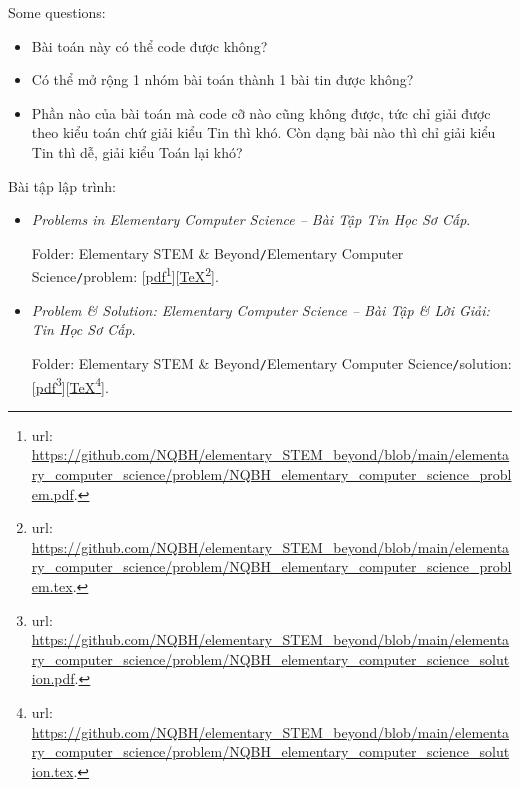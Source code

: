 \documentclass[12pt]{article}
\begin{document}
Some questions:
\begin{itemize}
	\item Bài toán này có thể code được không?
	\item Có thể mở rộng 1 nhóm bài toán thành 1 bài tin được không?
	\item Phần nào của bài toán mà code cỡ nào cũng không được, tức chỉ giải được theo kiểu toán chứ giải kiểu Tin thì khó. Còn dạng bài nào thì chỉ giải kiểu Tin thì dễ, giải kiểu Toán lại khó?
\end{itemize}
Bài tập lập trình:
\begin{itemize}
	\item {\it Problems in Elementary Computer Science -- Bài Tập Tin Học Sơ Cấp}.
	
	Folder: {\sf Elementary STEM \& Beyond{\tt/}Elementary Computer Science{\tt/}problem}: [\href{https://github.com/NQBH/elementary_STEM_beyond/blob/main/elementary_computer_science/problem/NQBH_elementary_computer_science_problem.pdf}{pdf}\footnote{{\sc url}: \url{https://github.com/NQBH/elementary_STEM_beyond/blob/main/elementary_computer_science/problem/NQBH_elementary_computer_science_problem.pdf}.}][\href{https://github.com/NQBH/elementary_STEM_beyond/blob/main/elementary_computer_science/problem/NQBH_elementary_computer_science_problem.tex}{\TeX}\footnote{{\sc url}: \url{https://github.com/NQBH/elementary_STEM_beyond/blob/main/elementary_computer_science/problem/NQBH_elementary_computer_science_problem.tex}.}].
	\item {\it Problem \& Solution: Elementary Computer Science -- Bài Tập \& Lời Giải: Tin Học Sơ Cấp}.
	
	Folder: {\sf Elementary STEM \& Beyond{\tt/}Elementary Computer Science{\tt/}solution}: [\href{https://github.com/NQBH/elementary_STEM_beyond/blob/main/elementary_computer_science/problem/NQBH_elementary_computer_science_solution.pdf}{pdf}\footnote{{\sc url}: \url{https://github.com/NQBH/elementary_STEM_beyond/blob/main/elementary_computer_science/problem/NQBH_elementary_computer_science_solution.pdf}.}][\href{https://github.com/NQBH/elementary_STEM_beyond/blob/main/elementary_computer_science/problem/NQBH_elementary_computer_science_solution.tex}{\TeX}\footnote{{\sc url}: \url{https://github.com/NQBH/elementary_STEM_beyond/blob/main/elementary_computer_science/problem/NQBH_elementary_computer_science_solution.tex}.}].
\end{itemize}

\end{document}
